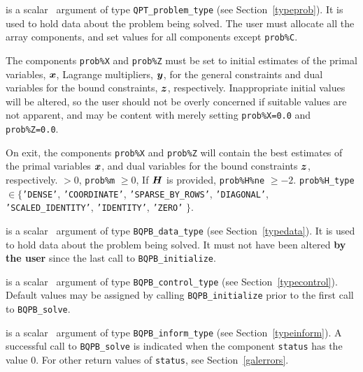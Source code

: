 \documentclass{galahad}
\newcommand{\packagename}{BQPB}
\begin{document}
\begin{description}
 is a scalar \intentinout\ argument of type
{\tt QPT\_problem\_type}
(see Section~\ref{typeprob}).
It is used to hold data about the problem being solved.
The user must allocate all the array components,
and set values for all components except {\tt prob\%C}.

The components {\tt prob\%X} and {\tt prob\%Z}
must be set to initial estimates of the primal variables, ${\bm{x}}$,
Lagrange multipliers, ${\bm{y}}$, for the general constraints
and dual variables for the bound constraints, ${\bm{z}}$, respectively.
Inappropriate initial values will be altered, so the user should
not be overly concerned if suitable values are not apparent, and may be
content with merely setting {\tt prob\%X=0.0}
and {\tt prob\%Z=0.0}.

On exit, the components {\tt prob\%X} and {\tt prob\%Z}
will contain the best estimates of the primal variables ${\bm{x}}$,
and dual variables for the bound constraints ${\bm{z}}$, respectively.
 $> 0$, {\tt prob\%m} $\geq 0$,
  If ${\bm{H}}$ is provided, {\tt prob\%H\%ne} $\geq -2$.
 {\tt prob\%H\_type} $\in \{${\tt 'DENSE'},
 {\tt 'COORDINATE'}, {\tt 'SPARSE\_BY\_\-ROWS'}, {\tt 'DIAGONAL'},
 {\tt 'SCALED\_IDENTITY'}, {\tt 'IDENTITY'}, {\tt 'ZERO'} $\}$.

 is a scalar \intentinout\ argument of type
{\tt \packagename\_data\_type}
(see Section~\ref{typedata}). It is used to hold data about the problem being
solved. It must not have been altered {\bf by the user} since the last call to
{\tt \packagename\_initialize}.

 is a scalar \intentin\ argument of type
{\tt \packagename\_control\_type}
(see Section~\ref{typecontrol}). Default values may be assigned by calling
{\tt \packagename\_initialize} prior to the first call to
{\tt \packagename\_solve}.

 is a scalar \intentinout\ argument of type
{\tt \packagename\_inform\_type}
(see Section~\ref{typeinform}).
A successful call to
{\tt \packagename\_solve}
is indicated when the  component {\tt status} has the value 0.
For other return values of {\tt status}, see Section~\ref{galerrors}.


\end{description}
\end{document}
